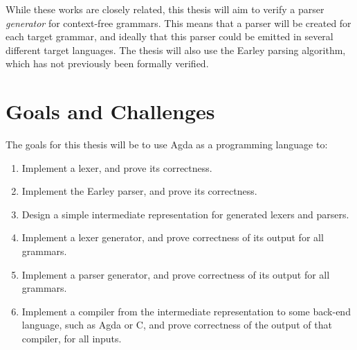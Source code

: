 \documentclass{article}
\begin{document}
	While these works are closely related, this thesis will aim to verify a
	parser \emph{generator} for context-free grammars. This means that a parser
	will be created for each target grammar, and ideally that this parser could
	be emitted in several different target languages. The thesis will also use
	the Earley parsing algorithm, which has not previously been formally
	verified.

\section{Goals and Challenges}

	
	The goals for this thesis will be to use Agda as a programming language to:
	
	\begin{enumerate}

%

		\item \label{lex}
			
			Implement a lexer, and prove its correctness.

		\item \label{par}
			
			Implement the Earley parser, and prove its correctness.
		
		\item \label{dsl}
			
			Design a simple intermediate representation for generated lexers
			and parsers. 

		\item \label{lexgen}
			
			Implement a lexer generator, and prove correctness of its output
			for all grammars.

		\item \label{pargen}
			
			Implement a parser generator, and prove correctness of its output
			for all grammars.
		
		\item \label{backend}

			Implement a compiler from the intermediate representation to some
			back-end language, such as Agda or C, and prove correctness of the
			output of that compiler, for all inputs.

	\end{enumerate}
	
\end{document}
